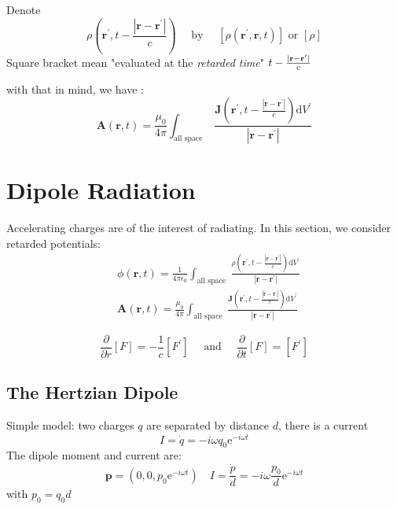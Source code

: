 \documentclass[12pt,a4paper]{article}
\begin{document}
Denote
$$
\rho\left(\boldsymbol{r}^{\prime}, t-\frac{\left|\boldsymbol{r}-\boldsymbol{r}^{\prime}\right|}{c}\right) \quad \text { by } \quad\left[\rho\left(\boldsymbol{r}^{\prime}, \boldsymbol{r}, t\right)\right] \text { or }[\rho]
$$
Square bracket mean "evaluated at the \textit{retarded time}" $t-\frac{|\vb{r}-\vb{r'}|}{c}$

with that in mind, we  have  :
$$
\boldsymbol{A}(\boldsymbol{r}, t)=\frac{\mu_0}{4 \pi} \int_{\text {all space }} \frac{\boldsymbol{J}\left(\boldsymbol{r}^{\prime}, t-\frac{\left|\boldsymbol{r}-\boldsymbol{r}^{\prime}\right|}{c}\right) \mathrm{d} V^{\prime}}{\left|\boldsymbol{r}-\boldsymbol{r}^{\prime}\right|}
$$

\section{Dipole Radiation}
Accelerating charges are of the interest of radiating.
In this section, we consider retarded potentials:
$$
\begin{aligned}
& \phi(\boldsymbol{r}, t)=\frac{1}{4 \pi \epsilon_0} \int_{\text {all space }} \frac{\rho\left(\boldsymbol{r}^{\prime}, t-\frac{\left|\boldsymbol{r}-\boldsymbol{r}^{\prime}\right|}{c}\right) \mathrm{d} V^{\prime}}{\left|\boldsymbol{r}-\boldsymbol{r}^{\prime}\right|} \\
& \boldsymbol{A}(\boldsymbol{r}, t)=\frac{\mu_0}{4 \pi} \int_{\text {all space }} \frac{\boldsymbol{J}\left(\boldsymbol{r}^{\prime}, t-\frac{\left|\boldsymbol{r}-\boldsymbol{r}^{\prime}\right|}{c}\right) \mathrm{d} V^{\prime}}{\left|\boldsymbol{r}-\boldsymbol{r}^{\prime}\right|}
\end{aligned}
$$

$$
\frac{\partial}{\partial r}[F]=-\frac{1}{c}\left[F^{\prime}\right] \quad \text { and } \quad \frac{\partial}{\partial t}[F]=\left[F^{\prime}\right]
$$
\subsection{The Hertzian Dipole}
Simple model: two charges $q$ are separated by distance $d$, there is a current $$
I=\dot{q}=-i \omega q_0 \mathrm{e}^{-i \omega t}
$$
The dipole moment and current are:
$$
\boldsymbol{p}=\left(0,0, p_0 \mathrm{e}^{-i \omega t}\right) \quad I=\frac{\dot{p}}{d}=-i \omega \frac{p_0}{d} \mathrm{e}^{-i \omega t}
$$
with $p_0=q_0 d$
\end{document}
